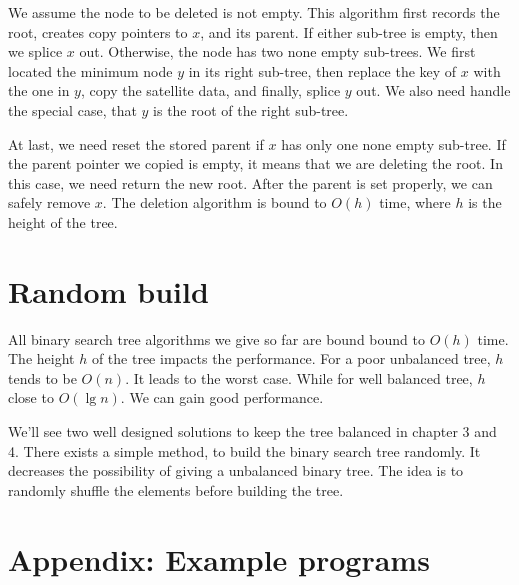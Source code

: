 \documentclass[b5paper]{article}
\begin{document}
We assume the node to be deleted is not empty. This algorithm first records the root, creates copy pointers to $x$, and its parent. If either sub-tree is empty, then we splice $x$ out. Otherwise, the node has two none empty sub-trees. We first located the minimum node $y$ in its right sub-tree, then replace the key of $x$ with the one in $y$, copy the satellite data, and finally, splice $y$ out. We also need handle the special case, that $y$ is the root of the right sub-tree.

At last, we need reset the stored parent if $x$ has only one none empty sub-tree. If the parent pointer we copied is empty, it means that we are deleting the root. In this case, we need return the new root. After the parent is set properly, we can safely remove $x$. The deletion algorithm is bound to $O(h)$ time, where $h$ is the height of the tree.

\begin{Exercise}


\end{Exercise}

\section{Random build}
All binary search tree algorithms we give so far are bound bound to $O(h)$ time. The height $h$ of the tree impacts the performance. For a poor unbalanced tree, $h$ tends to be $O(n)$. It leads to the worst case. While for well balanced tree, $h$ close to $O(\lg n)$. We can gain good performance.

We'll see two well designed solutions to keep the tree balanced in chapter 3 and 4. There exists a simple method, to build the binary search tree randomly\cite{CLRS}. It decreases the possibility of giving a unbalanced binary tree. The idea is to randomly shuffle the elements before building the tree.

\begin{Exercise}
\end{Exercise}

\section{Appendix: Example programs}
\end{document}
